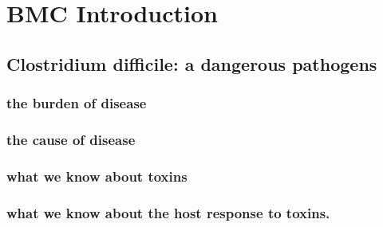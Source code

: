 \chapter{BMC Introduction}\label{chapter:intro2}

\section{Clostridium difficile: a dangerous pathogens}

\subsection{the burden of disease}

\subsection{the cause of disease}

\subsection{what we know about toxins}

\subsection{what we know about the host response to toxins.}


